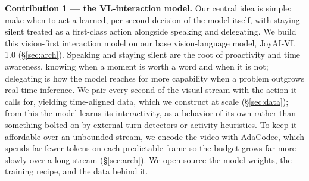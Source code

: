 \documentclass{llmxive}
\begin{document}

\textbf{Contribution 1 — the VL-interaction model.} Our central idea is simple: make when to act a learned, per-second decision of the model itself, with staying silent treated as a first-class action alongside speaking and delegating. We build this vision-first interaction model on our base vision-language model, JoyAI-VL 1.0 (\S\ref{sec:arch}). Speaking and staying silent are the root of proactivity and time awareness, knowing when a moment is worth a word and when it is not; delegating is how the model reaches for more capability when a problem outgrows real-time inference. We pair every second of the visual stream with the action it calls for, yielding time-aligned data, which we construct at scale (\S\ref{sec:data}); from this the model learns its interactivity, as a behavior of its own rather than something bolted on by external turn-detectors or activity heuristics. To keep it affordable over an unbounded stream, we encode the video with AdaCodec\cite{hou2026adacodecpredictivevisualcode}, which spends far fewer tokens on each predictable frame so the budget grows far more slowly over a long stream (\S\ref{sec:arch}). We open-source the model weights, the training recipe, and the data behind it.
\end{document}
